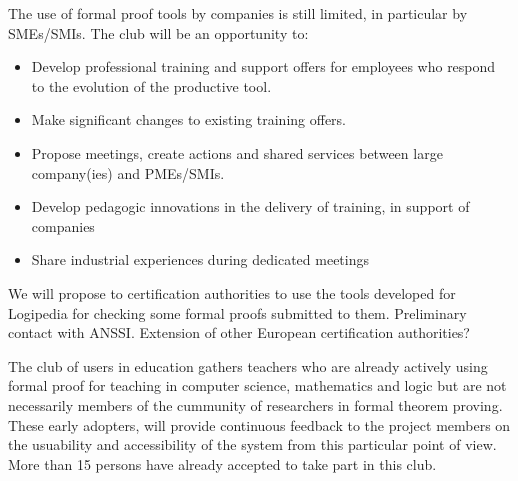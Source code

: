 \begin{workpackage}[id=dissemination,wphases=0-48,type=MGT,
  short=Dissemination,%
  title={Dissemination, communication and exploitation},
  lead=Inr]
\begin{tasklist}
  \begin{task}[id=industrial-club,
    title=Expanding the use of Logipedia in the industry,
    lead=Irt,IrtRM=2]
    The use of formal proof tools by companies is still limited, in particular by SMEs/SMIs. The club will be an opportunity to:
    \begin{itemize}
    \item Develop professional training and support offers for employees who respond to the evolution of the productive tool.
    \item Make significant changes to existing training offers.
    \item Propose meetings, create actions and shared services between large company(ies) and PMEs/SMIs.
    \item Develop pedagogic innovations in the delivery of training, in support of companies
    \item Share industrial experiences during dedicated meetings
    \end{itemize}
  \end{task}



  \begin{task}[id=certif-club,
      title=Expanding the use of Logipedia within certification authorities,
      lead=Irt,IrtRM=2]
    We will propose to certification authorities to use the tools
    developed for Logipedia for checking some formal proofs submitted
    to them. Preliminary contact with ANSSI. Extension of other
    European certification authorities?
  \end{task}

  \begin{task}[id=teachers-club,
      title=Expanding the use of Logipedia in education,
      lead=Str,StrRM=2] The club of users in education gathers
    teachers who are already actively using formal proof for teaching
    in computer science, mathematics and logic but are not necessarily
    members of the cummunity of researchers in formal theorem
    proving. These early adopters, will provide continuous feedback to
    the project members on the usuability and accessibility of the
    system from this particular point of view.  More than 15 persons
    have already accepted to take part in this club.


\end{task}
\end{tasklist}
\end{workpackage}
